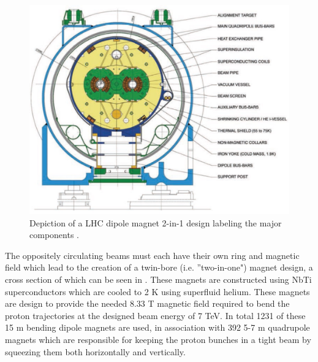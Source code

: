 \begin{figure}[!htbp] 
  \begin{center}
    \includegraphics[width=0.9\linewidth]{figures/lhc/dipole.jpg}
    \caption{ Depiction of a LHC dipole magnet 2-in-1 design labeling the major
components \cite{Dailler:842530}.} 
    \label{fig:dipole} 
  \end{center} 
\end{figure}

The oppositely circulating beams must each  have their own ring and magnetic field
which lead to the creation of a twin-bore (i.e. ''two-in-one") magnet design, a
cross section of which can be seen in . These magnets are constructed
using NbTi superconductors which are cooled to 2 K using superfluid helium.
These magnets are design to provide the needed 8.33 T magnetic field required
to bend the proton trajectories at the designed beam energy of 7 TeV.  In total 1231 of these 15
m bending dipole magnets are used, in association with 392 5-7 m
quadrupole magnets which are responsible for keeping the proton bunches in a
tight beam by squeezing them both horizontally and vertically.
